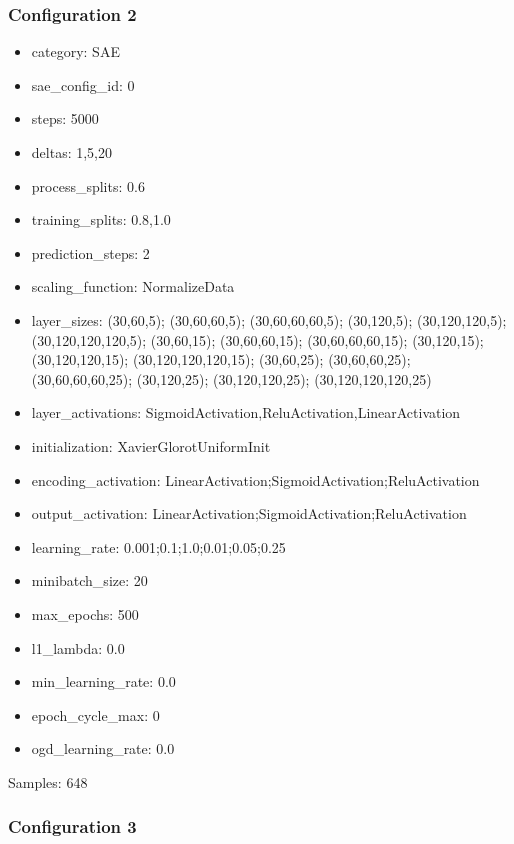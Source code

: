 \documentclass[a4paper,11pt,oneside]{article}
\theoremstyle{plain}
\theoremstyle{definition}
\begin{document}
	\subsubsection{Configuration 2}\label{config2}
	\begin{itemize}
		\item category: SAE
		\item sae\_config\_id: 0
		\item steps: 5000
		\item deltas: 1,5,20
		\item process\_splits: 0.6
		\item training\_splits: 0.8,1.0
		\item prediction\_steps: 2
		\item scaling\_function: NormalizeData
		\item layer\_sizes: (30,60,5); (30,60,60,5); (30,60,60,60,5); (30,120,5); (30,120,120,5); (30,120,120,120,5); (30,60,15); (30,60,60,15); (30,60,60,60,15); (30,120,15); (30,120,120,15); (30,120,120,120,15); (30,60,25); (30,60,60,25); (30,60,60,60,25); (30,120,25); (30,120,120,25); (30,120,120,120,25)
		\item layer\_activations: SigmoidActivation,ReluActivation,LinearActivation
		\item initialization: XavierGlorotUniformInit
		\item encoding\_activation: LinearActivation;SigmoidActivation;ReluActivation
		\item output\_activation: LinearActivation;SigmoidActivation;ReluActivation
		\item learning\_rate: 0.001;0.1;1.0;0.01;0.05;0.25
		\item minibatch\_size: 20
		\item max\_epochs: 500
		\item l1\_lambda: 0.0
		\item min\_learning\_rate: 0.0
		\item epoch\_cycle\_max: 0
		\item ogd\_learning\_rate: 0.0
	\end{itemize}
	
	Samples: 648
	
	\subsubsection{Configuration 3}\label{config3}
	
\end{document}
